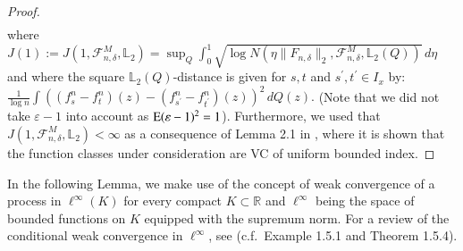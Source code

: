 \begin{proof}
\begin{align*}
		\end{align*}
		where $J(1) := J(1,\mathscr{F}_{n, \delta}^M, \mathbb{L}_2 ) = \sup_{Q} \int_{0}^{1} \sqrt{\log N(\eta \| F_{n,\delta} \|_2,\mathscr{F}_{n, \delta}^M, \mathbb{L}_2(Q))} \, d \eta$ and where the square $\mathbb{L}_2(Q)$-distance is given for $s,t$ and $s^\prime, t^\prime \in I_x$ by:
		$
		\frac{1}{\log n} \int ((f^n_s - f^n_t)(z) - (f^n_{s^\prime} - f^n_{t^\prime})(z))^2 \, d Q(z).
		$
		(Note that we did not take $\varepsilon-1$ into account as $\mathrm{E} (\varepsilon-1)^2=1$).
		Furthermore, we used that $J(1,\mathscr{F}_{n, \delta}^M, \mathbb{L}_2 ) < \infty$ as a consequence of Lemma 2.1 in \cite{27}, where it is shown that the function classes under consideration are VC of uniform bounded index.
	\end{proof}

	In the following Lemma, we make use of the concept of weak convergence of a process in $\ell^{\infty}(K)$ for every compact $K \subset \mathbb{R}$ and $\ell^{\infty}$ being the space of bounded functions on $K$ equipped with the supremum norm. For a review of the conditional weak convergence in $\ell^{\infty}$, see \cite{5} (c.f.\ Example 1.5.1 and Theorem 1.5.4).

